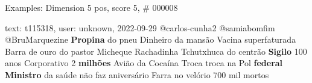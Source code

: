 \begin{frame}{Examples: Dimension 5 pos, score 5, \# 000008}
\footnotesize
\begin{exampleblock}{text: t115318, user: unknown, 2022-09-29}
@carlos-cunha2 @samiabomfim @BruMarquezine \textbf{Propina} do pneu Dinheiro da 
mansão Vacina superfaturada Barra de ouro do pastor Micheque Rachadinha 
Tchutxhuca do centrão \textbf{Sigilo} 100 anos Corporativo 2 \textbf{milhões} 
Avião da Cocaína Troca troca na Pol \textbf{federal} \textbf{Ministro} da saúde 
não faz aniversário Farra no velório  700 mil mortos 
\end{exampleblock}
\end{frame}
